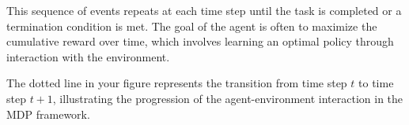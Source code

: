 This sequence of events repeats at each time step until the task is completed or a termination condition is met. The goal of the agent is often to maximize the cumulative reward over time, which involves learning an optimal policy through interaction with the environment.

The dotted line in your figure represents the transition from time step \( t \) to time step \( t+1 \), illustrating the progression of the agent-environment interaction in the MDP framework.